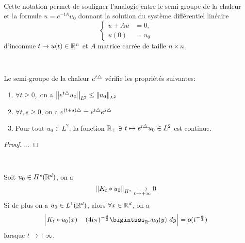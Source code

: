 \documentclass[french,a4paper,10pt]{article}
\begin{document}
            Cette notation permet de souligner l'analogie entre le semi-groupe de la chaleur et la formule $u=e^{-tA}u_0$ donnant la solution du système différentiel linéaire 
            \begin{equation*}
                \begin{cases}
                    \dot{u} + Au &=0,\\
                    u(0) &= u_0
                \end{cases}
            \end{equation*}
            d'inconnue $t\mapsto u(t) \in \mathbb{R}^n$ et $A$ matrice carrée de taille $n\times n$.

            \begin{proposition}\label{prop:3.3.9}~

                Le semi-groupe de la chaleur $e^{t\triangle}$ vérifie les propriétés suivantes:
                \begin{enumerate}
                    \item $\forall t \geq0,$ on a ${\mathopen{}\left\|e^{t\triangle} u_0\right\|\mathclose{}}_{L^2}\leq {\mathopen{}\left\|u_0\right\|\mathclose{}}_{L^2}$

                    \item $\forall t,s\geq 0$, on a $e^{(t+s)\triangle} = e^{t\triangle} e^{s\triangle}$

                    \item Pour tout $u_0 \in L^2$, la fonction  $\mathbb{R}_+ \ni t \mapsto e^{t\triangle} u_0 \in L^2$ est continue.
                \end{enumerate}
            \end{proposition}

            \begin{proof}
                ...
            \end{proof}

            \begin{proposition}\label{3.3.10}~

                Soit $u_0 \in H^s(\mathbb{R}^d)$, on a
                \begin{equation*}
                    {\mathopen{}\left\|K_t \ast u_0\right\|\mathclose{}}_{H^s} \underset{t \to +\infty}{\longrightarrow} 0
                \end{equation*}
                Si de plus on a $u_0 \in L^1(\mathbb{R}^d)$, alors $\forall x \in \mathbb{R}^d$, on a
                \begin{equation*}
                    \n{K_t \ast u_0(x) - (4t\pi)^{-\frac{d}{2}} \bigintsss_{\R^d} u_0(y)\ dy} = o(t^{-\frac{d}{2}})
                \end{equation*}
                lorsque $t \to +\infty$.
            \end{proposition}
\end{document}
